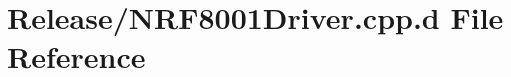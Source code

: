 \hypertarget{_release_2_n_r_f8001_driver_8cpp_8d}{\section{\-Release/\-N\-R\-F8001\-Driver.cpp.\-d \-File \-Reference}
\label{_release_2_n_r_f8001_driver_8cpp_8d}
}
